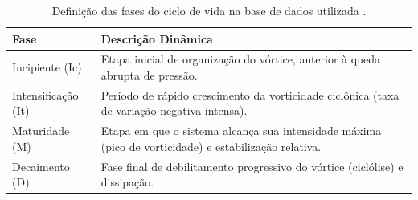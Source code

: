 \begin{table}[ht]
\centering
\caption[Definição das fases do ciclo de vida]{Definição das fases do ciclo de vida na base de dados utilizada \citep{coutodesouza2024new}.}
\label{tab:fases_def}
\begin{tabular*}{\textwidth}{@{\extracolsep{\fill}}lp{10cm}}
\hline
Fase & Descrição Dinâmica \\
\hline
Incipiente (Ic) & Etapa inicial de organização do vórtice, anterior à queda abrupta de pressão. \\
Intensificação (It) & Período de rápido crescimento da vorticidade ciclônica (taxa de variação negativa intensa). \\
Maturidade (M) & Etapa em que o sistema alcança sua intensidade máxima (pico de vorticidade) e estabilização relativa. \\
Decaimento (D) & Fase final de debilitamento progressivo do vórtice (ciclólise) e dissipação. \\
\hline
\end{tabular*}
\end{table}

